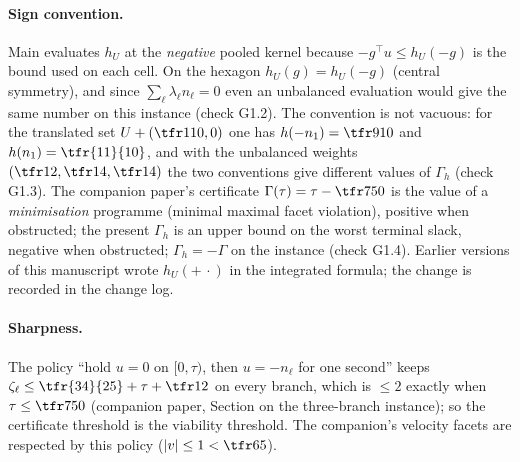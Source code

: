\paragraph{Sign convention.} Main  evaluates $h_U$ at the \emph{negative} pooled kernel because $-g^\top u\le h_U(-g)$ is the bound used on each cell. On the hexagon $h_U(g)=h_U(-g)$ (central symmetry), and since $\sum_\ell\lambda_\ell n_\ell=0$ even an unbalanced evaluation would give the same number on this instance (check G1.2). The convention is not vacuous: for the translated set $U+(\tfr1{10},0)$ one has $h(-n_1)=\tfr9{10}$ and $h(n_1)=\tfr{11}{10}$, and with the unbalanced weights $(\tfr12,\tfr14,\tfr14)$ the two conventions give different values of $\Gamma_h$ (check G1.3). The companion paper's certificate $\Gamma(\tau)=\tau-\tfr7{50}$ is the value of a \emph{minimisation} programme (minimal maximal facet violation), positive when obstructed; the present $\Gamma_h$ is an upper bound on the worst terminal slack, negative when obstructed; $\Gamma_h=-\Gamma$ on the instance (check G1.4). Earlier versions of this manuscript wrote $h_U(+\,\cdot)$ in the integrated formula; the change is recorded in the change log.

\paragraph{Sharpness.} The policy ``hold $u=0$ on $[0,\tau)$, then $u=-n_\ell$ for one second'' keeps $\zeta_\ell\le\tfr{34}{25}+\tau+\tfr12$ on every branch, which is $\le2$ exactly when $\tau\le\tfr7{50}$ (companion paper, Section on the three-branch instance); so the certificate threshold is the viability threshold. The companion's velocity facets are respected by this policy ($|v|\le1<\tfr65$).
